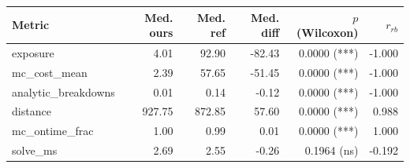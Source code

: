 \begin{tabular}{lrrrrr}
\toprule
Metric & Med. ours & Med. ref & Med. diff & $p$ (Wilcoxon) & $r_{rb}$ \\
\midrule
exposure & 4.01 & 92.90 & -82.43 & 0.0000 (***) & -1.000 \\
mc_cost_mean & 2.39 & 57.65 & -51.45 & 0.0000 (***) & -1.000 \\
analytic_breakdowns & 0.01 & 0.14 & -0.12 & 0.0000 (***) & -1.000 \\
distance & 927.75 & 872.85 & 57.60 & 0.0000 (***) & 0.988 \\
mc_ontime_frac & 1.00 & 0.99 & 0.01 & 0.0000 (***) & 1.000 \\
solve_ms & 2.69 & 2.55 & -0.26 & 0.1964 (ns) & -0.192 \\
\bottomrule
\end{tabular}
